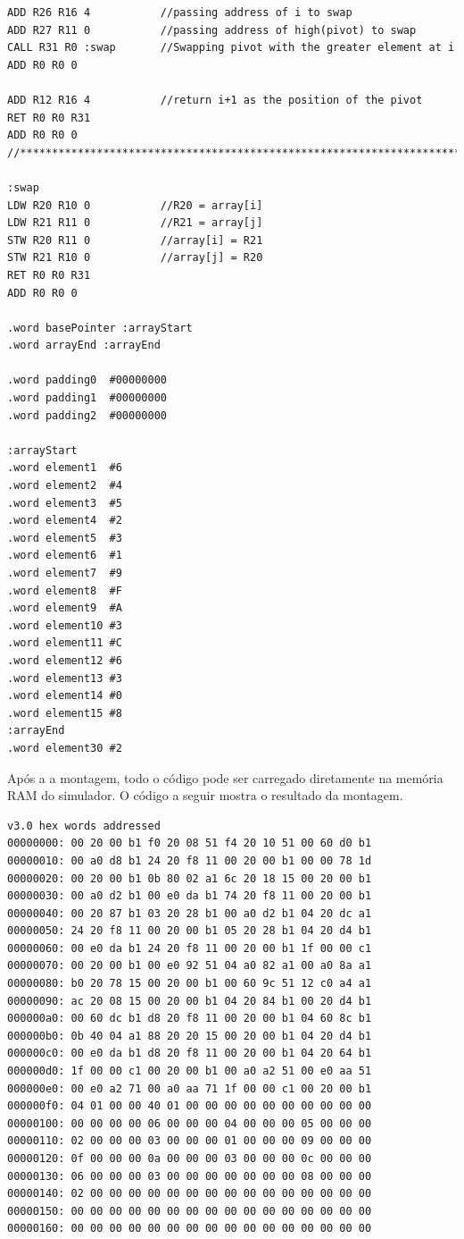 \documentclass[
	article,			%
	11pt,				%
	oneside,			%
	a4paper,			%
	english,			%
	brazil,				%
	sumario=tradicional
	]{abntex2}
\begin{document}
\begin{lstlisting}
ADD R26 R16 4			//passing address of i to swap
ADD R27 R11 0			//passing address of high(pivot) to swap
CALL R31 R0 :swap		//Swapping pivot with the greater element at i
ADD R0 R0 0

ADD R12 R16 4			//return i+1 as the position of the pivot
RET R0 R0 R31
ADD R0 R0 0
//********************************************************************************//

:swap
LDW R20 R10 0			//R20 = array[i]
LDW R21 R11 0			//R21 = array[j]
STW R20 R11 0			//array[i] = R21
STW R21 R10 0			//array[j] = R20
RET R0 R0 R31
ADD R0 R0 0

.word basePointer :arrayStart
.word arrayEnd :arrayEnd

.word padding0 	#00000000
.word padding1 	#00000000
.word padding2 	#00000000
				
:arrayStart		
.word element1 	#6
.word element2 	#4
.word element3 	#5
.word element4 	#2
.word element5 	#3
.word element6 	#1
.word element7 	#9
.word element8 	#F
.word element9 	#A
.word element10 #3
.word element11 #C
.word element12 #6
.word element13 #3
.word element14 #0
.word element15 #8
:arrayEnd
.word element30 #2
\end{lstlisting}
\newpage
Após a a montagem, todo o código pode ser carregado diretamente na memória RAM do simulador. O código a seguir mostra o resultado da montagem.

\begin{lstlisting}
v3.0 hex words addressed
00000000: 00 20 00 b1 f0 20 08 51 f4 20 10 51 00 60 d0 b1
00000010: 00 a0 d8 b1 24 20 f8 11 00 20 00 b1 00 00 78 1d
00000020: 00 20 00 b1 0b 80 02 a1 6c 20 18 15 00 20 00 b1
00000030: 00 a0 d2 b1 00 e0 da b1 74 20 f8 11 00 20 00 b1
00000040: 00 20 87 b1 03 20 28 b1 00 a0 d2 b1 04 20 dc a1
00000050: 24 20 f8 11 00 20 00 b1 05 20 28 b1 04 20 d4 b1
00000060: 00 e0 da b1 24 20 f8 11 00 20 00 b1 1f 00 00 c1
00000070: 00 20 00 b1 00 e0 92 51 04 a0 82 a1 00 a0 8a a1
00000080: b0 20 78 15 00 20 00 b1 00 60 9c 51 12 c0 a4 a1
00000090: ac 20 08 15 00 20 00 b1 04 20 84 b1 00 20 d4 b1
000000a0: 00 60 dc b1 d8 20 f8 11 00 20 00 b1 04 60 8c b1
000000b0: 0b 40 04 a1 88 20 20 15 00 20 00 b1 04 20 d4 b1
000000c0: 00 e0 da b1 d8 20 f8 11 00 20 00 b1 04 20 64 b1
000000d0: 1f 00 00 c1 00 20 00 b1 00 a0 a2 51 00 e0 aa 51
000000e0: 00 e0 a2 71 00 a0 aa 71 1f 00 00 c1 00 20 00 b1
000000f0: 04 01 00 00 40 01 00 00 00 00 00 00 00 00 00 00
00000100: 00 00 00 00 06 00 00 00 04 00 00 00 05 00 00 00
00000110: 02 00 00 00 03 00 00 00 01 00 00 00 09 00 00 00
00000120: 0f 00 00 00 0a 00 00 00 03 00 00 00 0c 00 00 00
00000130: 06 00 00 00 03 00 00 00 00 00 00 00 08 00 00 00
00000140: 02 00 00 00 00 00 00 00 00 00 00 00 00 00 00 00
00000150: 00 00 00 00 00 00 00 00 00 00 00 00 00 00 00 00
00000160: 00 00 00 00 00 00 00 00 00 00 00 00 00 00 00 00
\end{lstlisting}
\end{document}

